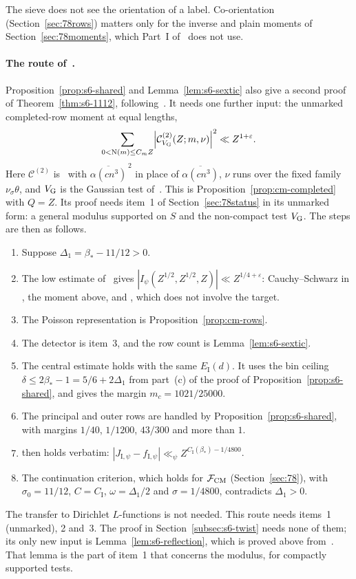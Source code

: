 \documentclass[11pt]{article}
\numberwithin{equation}{section}
\newcommand{\N}{\mathrm N}
\begin{document}
The sieve does not see the orientation of a label. Co-orientation (Section~\ref{sec:78rows}) matters only
for the inverse and plain moments of Section~\ref{sec:78moments}, which Part~I of~\cite{OAI78} does not use.

\paragraph{The route of~\cite{OAI78}.} Proposition~\ref{prop:s6-shared} and Lemma~\ref{lem:s6-sextic} also
give a second proof of Theorem~\ref{thm:s6-1112}, following~\cite{OAI78}. It needs one further input: the
unmarked completed-row moment at equal lengths,
\begin{equation}\label{eq:d198}
 \sum_{0<\N(m)\le C_mZ}\Bigl|\mathcal C^{(2)}_{V_{\rm G}}(Z;m,\nu)\Bigr|^2\ll Z^{1+\varepsilon}.
\end{equation}
Here $\mathcal C^{(2)}$ is~\cite[eq.~(5.30)]{OAI78} with
$\overline{\alpha(cn^3)}^{\,2}$ in place of $\overline{\alpha(cn^3)}$, $\nu$ runs over the fixed family
$\nu_\sigma\theta$, and $V_{\rm G}$ is the Gaussian test of~\cite{OAI78}. This is
Proposition~\ref{prop:cm-completed} with $Q=Z$. Its proof needs item~1 of Section~\ref{sec:78status} in its
unmarked form: a general modulus supported on $S$ and the non-compact test $V_{\rm G}$. The steps are then as
follows.
\begin{enumerate}
\item Suppose $\Delta_1=\beta_*-11/12>0$.
\item The low estimate of~\cite[Prop.~6.3]{OAI78} gives $|I_\psi(Z^{1/2},Z^{1/2},Z)|\ll
 Z^{1/4+\varepsilon}$: Cauchy--Schwarz in \cite[eq.~(6.2)]{OAI78}, the moment above, and
 \cite[Lemma~6.2]{OAI78}, which does not involve the target.
\item The Poisson representation is Proposition~\ref{prop:cm-rows}.
\item The detector is item~3, and the row count is Lemma~\ref{lem:s6-sextic}.
\item The central estimate \cite[eq.~(10.12)]{OAI78} holds with the same $E_{\mathrm I}(d)$. It uses the bin
 ceiling $\delta\le2\beta_*-1=5/6+2\Delta_1$ from part~(c) of the proof of Proposition~\ref{prop:s6-shared}, and gives
 the margin
 $m_c=1021/25000$.
\item The principal and outer rows are handled by Proposition~\ref{prop:s6-shared}, with margins $1/40$,
 $1/1200$, $43/300$ and more than $1$.
\item \cite[Prop.~11.2]{OAI78} then holds verbatim:
 $|J_{\mathrm I,\psi}-f_{\mathrm I,\psi}|\ll_\psi Z^{C_{\mathrm I}(\beta_*)-1/4800}$.
\item The continuation criterion, which holds for $\mathcal F_{\rm CM}$ (Section~\ref{sec:78}), with
 $\sigma_0=11/12$, $C=C_{\mathrm I}$, $\omega=\Delta_1/2$ and $\sigma=1/4800$, contradicts $\Delta_1>0$.
\end{enumerate}
The transfer to Dirichlet $L$-functions is not needed. This route needs items~1 (unmarked), 2 and~3. The proof
in Section~\ref{subsec:s6-twist} needs none of them; its only new input is Lemma~\ref{lem:s6-reflection}, which
is proved above from~\cite[App.~A.2]{OAI1112}. That lemma is the part of item~1 that concerns the modulus, for
compactly supported tests.
\end{document}
